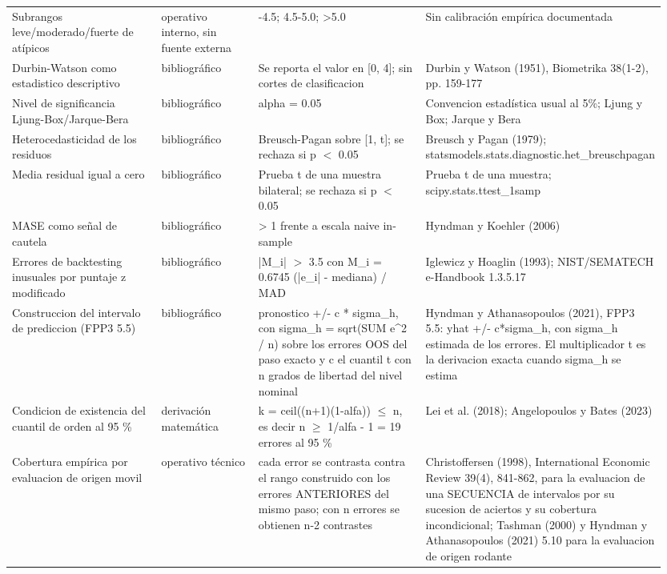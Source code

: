 {\begin{longtable}{@{}>{\raggedright\arraybackslash}p{0.238\linewidth}>{\raggedright\arraybackslash}p{0.152\linewidth}>{\raggedright\arraybackslash}p{0.266\linewidth}>{\raggedright\arraybackslash}p{0.295\linewidth}@{}}
Subrangos leve/moderado/fuerte de atípicos & operativo interno, sin fuente externa & 3.5-4.5; 4.5-5.0; >5.0 & Sin calibración empírica documentada \\
Durbin-Watson como estadistico descriptivo & bibliográfico & Se reporta el valor en [0, 4]; sin cortes de clasificacion & Durbin y Watson (1951), Biometrika 38(1-2), pp. 159-177 \\
Nivel de significancia Ljung-Box/Jarque-Bera & bibliográfico & alpha = 0.05 & Convencion estadística usual al 5\%; Ljung y Box; Jarque y Bera \\
Heterocedasticidad de los residuos & bibliográfico & Breusch-Pagan sobre [1, t]; se rechaza si p $<$ 0.05 & Breusch y Pagan (1979); statsmodels.stats.diagnostic.het\_\allowbreak{}breuschpagan \\
Media residual igual a cero & bibliográfico & Prueba t de una muestra bilateral; se rechaza si p $<$ 0.05 & Prueba t de una muestra; scipy.stats.ttest\_\allowbreak{}1samp \\
MASE como señal de cautela & bibliográfico & > 1 frente a escala naive in-sample & Hyndman y Koehler (2006) \\
Errores de backtesting inusuales por puntaje z modificado & bibliográfico & |M\_\allowbreak{}i| $>$ 3.5 con M\_\allowbreak{}i = 0.6745 (|e\_\allowbreak{}i| - mediana) / MAD & Iglewicz y Hoaglin (1993); NIST/SEMATECH e-Handbook 1.3.5.17 \\
Construccion del intervalo de prediccion (FPP3 5.5) & bibliográfico & pronostico +/- c * sigma\_\allowbreak{}h, con sigma\_\allowbreak{}h = sqrt(SUM e\textasciicircum{}2 / n) sobre los errores OOS del paso exacto y c el cuantil t con n grados de libertad del nivel nominal & Hyndman y Athanasopoulos (2021), FPP3 5.5: yhat +/- c*sigma\_\allowbreak{}h, con sigma\_\allowbreak{}h estimada de los errores. El multiplicador t es la derivacion exacta cuando sigma\_\allowbreak{}h se estima \\
Condicion de existencia del cuantil de orden al 95 \% & derivación matemática & k = ceil((n+1)(1-alfa)) $\leq$ n, es decir n $\geq$ 1/alfa - 1 = 19 errores al 95 \% & Lei et al. (2018); Angelopoulos y Bates (2023) \\
Cobertura empírica por evaluacion de origen movil & operativo técnico & cada error se contrasta contra el rango construido con los errores ANTERIORES del mismo paso; con n errores se obtienen n-2 contrastes & Christoffersen (1998), International Economic Review 39(4), 841-862, para la evaluacion de una SECUENCIA de intervalos por su sucesion de aciertos y su cobertura incondicional; Tashman (2000) y Hyndman y Athanasopoulos (2021) 5.10 para la evaluacion de origen rodante \\

\end{longtable}}
